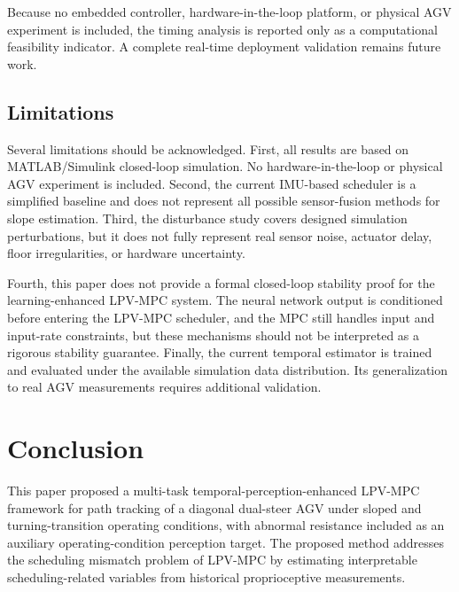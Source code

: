 \documentclass{ieeeaccess}
\begin{document}
Because no embedded controller, hardware-in-the-loop platform, or physical AGV experiment is included, the timing analysis is reported only as a computational feasibility indicator. A complete real-time deployment validation remains future work.



\subsection{Limitations}



Several limitations should be acknowledged. First, all results are based on MATLAB/Simulink closed-loop simulation. No hardware-in-the-loop or physical AGV experiment is included. Second, the current IMU-based scheduler is a simplified baseline and does not represent all possible sensor-fusion methods for slope estimation. Third, the disturbance study covers designed simulation perturbations, but it does not fully represent real sensor noise, actuator delay, floor irregularities, or hardware uncertainty.



Fourth, this paper does not provide a formal closed-loop stability proof for the learning-enhanced LPV-MPC system. The neural network output is conditioned before entering the LPV-MPC scheduler, and the MPC still handles input and input-rate constraints, but these mechanisms should not be interpreted as a rigorous stability guarantee. Finally, the current temporal estimator is trained and evaluated under the available simulation data distribution. Its generalization to real AGV measurements requires additional validation.



\section{Conclusion}

\label{sec:conclusion}



This paper proposed a multi-task temporal-perception-enhanced LPV-MPC framework for path tracking of a diagonal dual-steer AGV under sloped and turning-transition operating conditions, with abnormal resistance included as an auxiliary operating-condition perception target. The proposed method addresses the scheduling mismatch problem of LPV-MPC by estimating interpretable scheduling-related variables from historical proprioceptive measurements.
\end{document}
